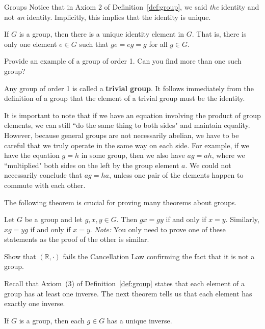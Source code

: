 \begin{section}{Groups}
Notice that in Axiom 2 of Definition~\ref{def:group}, we said \emph{the} identity and not \emph{an} identity.  Implicitly, this implies that the identity is unique.

\begin{theorem}\label{thm:unique_id}
If $G$ is a group, then there is a unique identity element in $G$.  That is, there is only one element $e\in G$ such that $ge=eg=g$ for all $g\in G$.
\end{theorem}

\begin{problem}
Provide an example of a group of order 1.  Can you find more than one such group?
\end{problem}

Any group of order 1 is called a \textbf{trivial group}. It follows immediately from the definition of a group that the element of a trivial group must be the identity.

It is important to note that if we have an equation involving the product of group elements, we can still ``do the same thing to both sides" and maintain equality. However, because general groups are not necessarily abelian, we have to be careful that we truly operate in the same way on each side. For example, if we have the equation $g = h$ in some group, then we also have $ag = ah$, where we ``multiplied" both sides on the left by the group element $a$. We could not necessarily conclude that $ag = ha$, unless one pair of the elements happen to commute with each other.

The following theorem is crucial for proving many theorems about groups.

\begin{theorem}
Let $G$ be a group and let $g,x,y\in G$.  Then $gx=gy$ if and only if $x=y$.  Similarly, $xg=yg$ if and only if $x=y$. \emph{Note:} You only need to prove one of these statements as the proof of the other is similar.
\end{theorem}

\begin{problem}
Show that $(\mathbb{R},\cdot)$ fails the Cancellation Law confirming the fact that it is not a group.
\end{problem}

Recall that Axiom~(3) of Definition~\ref{def:group} states that each element of a group has at least one inverse.  The next theorem tells us that each element has exactly one inverse.

\begin{theorem}\label{thm:unique_inverse}
If $G$ is a group, then each $g\in G$ has a unique inverse.
\end{theorem}


\end{section}
